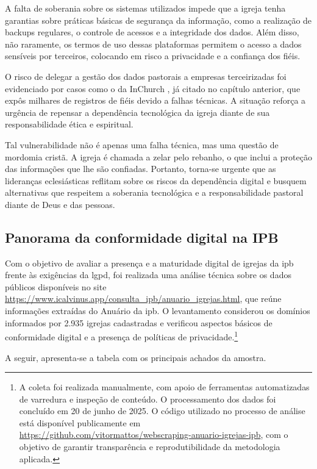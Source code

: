 A falta de soberania sobre os sistemas utilizados impede que a igreja tenha garantias sobre práticas básicas de segurança da informação, como a realização de backups regulares, o controle de acessos e a integridade dos dados. Além disso, não raramente, os termos de uso dessas plataformas permitem o acesso a dados sensíveis por terceiros, colocando em risco a privacidade e a confiança dos fiéis.

O risco de delegar a gestão dos dados pastorais a empresas terceirizadas foi evidenciado por casos como o da InChurch \cite{almeida_inchurch_2024}, já citado no capítulo anterior, que expôs milhares de registros de fiéis devido a falhas técnicas. A situação reforça a urgência de repensar a dependência tecnológica da igreja diante de sua responsabilidade ética e espiritual.

Tal vulnerabilidade não é apenas uma falha técnica, mas uma questão de mordomia cristã. A igreja é chamada a zelar pelo rebanho, o que inclui a proteção das informações que lhe são confiadas. Portanto, torna-se urgente que as lideranças eclesiásticas reflitam sobre os riscos da dependência digital e busquem alternativas que respeitem a soberania tecnológica e a responsabilidade pastoral diante de Deus e das pessoas.

\subsection{Panorama da conformidade digital na IPB}

Com o objetivo de avaliar a presença e a maturidade digital de igrejas da \gls{ipb} frente às exigências da \gls{lgpd}, foi realizada uma análise técnica sobre os dados públicos disponíveis no site \url{https://www.icalvinus.app/consulta_ipb/anuario_igrejas.html}, que reúne informações extraídas do Anuário da \gls{ipb}. O levantamento considerou os domínios informados por 2.935 igrejas cadastradas e verificou aspectos básicos de conformidade digital e a presença de políticas de privacidade.\footnote{A coleta foi realizada manualmente, com apoio de ferramentas automatizadas de varredura e inspeção de conteúdo. O processamento dos dados foi concluído em 20 de junho de 2025. O código utilizado no processo de análise está disponível publicamente em \url{https://github.com/vitormattos/webscraping-anuario-igrejas-ipb}, com o objetivo de garantir transparência e reprodutibilidade da metodologia aplicada.}

A seguir, apresenta-se a tabela com os principais achados da amostra.

